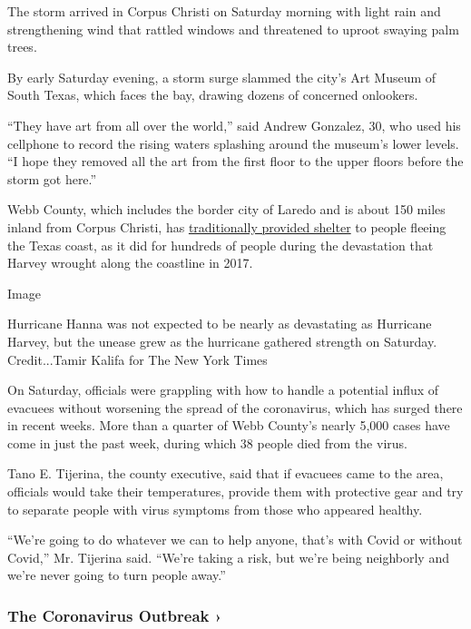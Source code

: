 The storm arrived in Corpus Christi on Saturday morning with light rain
and strengthening wind that rattled windows and threatened to uproot
swaying palm trees.

By early Saturday evening, a storm surge slammed the city's Art Museum
of South Texas, which faces the bay, drawing dozens of concerned
onlookers.

``They have art from all over the world,'' said Andrew Gonzalez, 30, who
used his cellphone to record the rising waters splashing around the
museum's lower levels. ``I hope they removed all the art from the first
floor to the upper floors before the storm got here.''

Webb County, which includes the border city of Laredo and is about 150
miles inland from Corpus Christi, has
\href{https://www.lmtonline.com/local/article/City-officials-About-150-Hurricane-Harvey-11960437.php}{traditionally
provided shelter} to people fleeing the Texas coast, as it did for
hundreds of people during the devastation that Harvey wrought along the
coastline in 2017.

Image

Hurricane Hanna was not expected to be nearly as devastating as
Hurricane Harvey, but the unease grew as the hurricane gathered strength
on Saturday. Credit...Tamir Kalifa for The New York Times

On Saturday, officials were grappling with how to handle a potential
influx of evacuees without worsening the spread of the coronavirus,
which has surged there in recent weeks. More than a quarter of Webb
County's nearly 5,000 cases have come in just the past week, during
which 38 people died from the virus.

Tano E. Tijerina, the county executive, said that if evacuees came to
the area, officials would take their temperatures, provide them with
protective gear and try to separate people with virus symptoms from
those who appeared healthy.

``We're going to do whatever we can to help anyone, that's with Covid or
without Covid,'' Mr. Tijerina said. ``We're taking a risk, but we're
being neighborly and we're never going to turn people away.''

\href{https://www.nytimes.com/news-event/coronavirus?action=click\&pgtype=Article\&state=default\&region=MAIN_CONTENT_3\&context=storylines_faq}{}

\hypertarget{the-coronavirus-outbreak-}{%
\subsubsection{The Coronavirus Outbreak
›}\label{the-coronavirus-outbreak-}}

